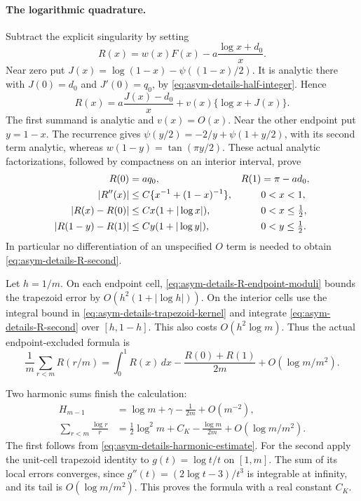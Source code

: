 \paragraph{The logarithmic quadrature.}
Subtract the explicit singularity by setting
\begin{equation}\label{eq:asym-details-R-definition}
 R(x)=w(x)F(x)-a\frac{\log x+d_0}{x}.
\end{equation}
Near zero put $J(x)=\log(1-x)-\psi((1-x)/2)$.
It is analytic there with $J(0)=d_0$ and $J'(0)=q_0$, by
\eqref{eq:asym-details-half-integer}.  Hence
\[
 R(x)=a\frac{J(x)-d_0}{x}+v(x)\{\log x+J(x)\}.
\]
The first summand is analytic and $v(x)=O(x)$.  Near the other
endpoint put $y=1-x$.  The recurrence gives
$\psi(y/2)=-2/y+\psi(1+y/2)$, with its second term analytic,
whereas $w(1-y)=\tan(\pi y/2)$.  These actual analytic
factorizations, followed by compactness on an interior interval, prove
\begin{align}
 R(0)&=aq_0,&R(1)&=\pi-ad_0,
 \label{eq:asym-details-R-endpoints}\\
 |R''(x)|&\leq C\{x^{-1}+(1-x)^{-1}\},&&0<x<1,
 \label{eq:asym-details-R-second}\\
 |R(x)-R(0)|&\leq Cx(1+|\log x|),&&0<x\leq\tfrac12,
 \notag\\
 |R(1-y)-R(1)|&\leq Cy(1+|\log y|),&&0<y\leq\tfrac12.
 \label{eq:asym-details-R-endpoint-moduli}
\end{align}
In particular no differentiation of an unspecified $O$ term is needed
to obtain \eqref{eq:asym-details-R-second}.

Let $h=1/m$.  On each endpoint cell,
\eqref{eq:asym-details-R-endpoint-moduli} bounds the trapezoid error
by $O(h^2(1+|\log h|))$.  On the interior cells use the integral
bound in \eqref{eq:asym-details-trapezoid-kernel} and integrate
\eqref{eq:asym-details-R-second} over $[h,1-h]$.  This also costs
$O(h^2\log m)$.  Thus the actual endpoint-excluded formula is
\begin{equation}\label{eq:asym-details-R-quadrature}
 \frac1m\sum_{r<m}R(r/m)=\int_0^1R(x)\,dx
       -\frac{R(0)+R(1)}{2m}+O(\log m/m^2).
\end{equation}

Two harmonic sums finish the calculation:
\begin{align}
 H_{m-1}&=\log m+\gamma-\frac1{2m}+O(m^{-2}),
 \label{eq:asym-details-Hm1}\\
 \sum_{r<m}\frac{\log r}{r}
   &=\frac12\log^2m+C_K-\frac{\log m}{2m}
                                     +O(\log m/m^2).
 \label{eq:asym-details-log-harmonic}
\end{align}
The first follows from \eqref{eq:asym-details-harmonic-estimate}.
For the second apply the unit-cell trapezoid identity to
$g(t)=\log t/t$ on $[1,m]$.  The sum of its local errors converges,
since $g''(t)=(2\log t-3)/t^3$ is integrable at infinity, and its
tail is $O(\log m/m^2)$.  This proves the formula with a real
constant $C_K$.

